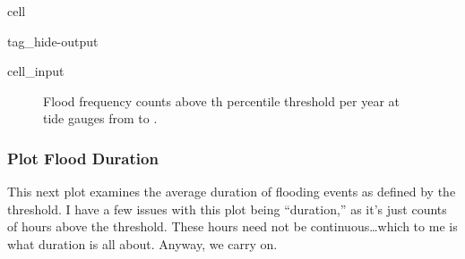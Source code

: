 \documentclass[letterpaper,10pt,english]{jupyterBook}
\begin{document}
\begin{sphinxuseclass}{cell}
\begin{sphinxuseclass}{tag_hide-output}
\begin{sphinxVerbatimInput}
\begin{sphinxuseclass}{cell_input}
\begin{sphinxVerbatim}[commandchars=\\\{\}]

  

   
\end{sphinxVerbatim}

\end{sphinxuseclass}\end{sphinxVerbatimInput}

\end{sphinxuseclass}
\end{sphinxuseclass}
\begin{figure}[htbp]
\centering
\capstart

\noindent{}
\caption{Flood frequency counts above th percentile threshold per year at  tide gauges from  to .}\label{\detokenize{notebooks/FloodFrequency:fig-threshold-counts}}\end{figure}


\subsubsection{Plot Flood Duration}
\label{\detokenize{notebooks/FloodFrequency:plot-flood-duration}}
\sphinxAtStartPar
This next plot examines the average duration of flooding events as defined by the threshold.
I have a few issues with this plot being “duration,” as it’s just counts of hours above the threshold. These hours need not be continuous…which to me is what duration is all about. Anyway, we carry on.
\end{document}
